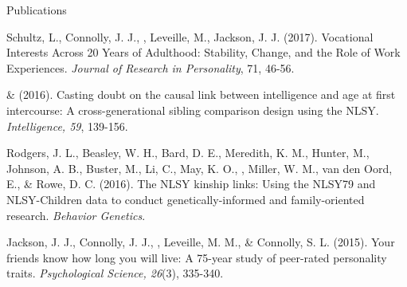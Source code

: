 \begin{rSection}{\textrm{Publications}}
\begin{etaremune}
%
\item Schultz, L., Connolly, J. J., \meb, Leveille, M., Jackson, J. J. (2017). Vocational Interests Across 20 Years of Adulthood: Stability, Change, and the Role of Work Experiences. \textit{Journal of Research in Personality}, 71, 46-56. 
\item \meb \& \Joe (2016). Casting doubt on the causal link between intelligence and age at first intercourse: A cross-generational sibling comparison design using the NLSY. \textit{Intelligence, 59}, 139-156. 
%
\item Rodgers, J. L., Beasley, W. H., Bard, D. E., Meredith, K. M., Hunter, M., Johnson, A. B., Buster, M., Li, C., May, K. O., \meb, Miller, W. M., van den Oord, E., \& Rowe, D. C. (2016). The NLSY kinship links: Using the NLSY79 and NLSY-Children data to conduct genetically-informed and family-oriented research. \textit{Behavior Genetics}. 
%
\item Jackson, J. J., Connolly, J. J., \meb, Leveille, M. M., \& Connolly, S. L. (2015). Your friends know how long you will live: A 75-year study of peer-rated personality traits. \textit{Psychological Science, 26}(3), 335-340. 
%
\end{etaremune}\end{rSection}%
